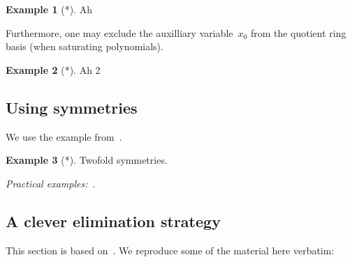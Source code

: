 \documentclass[11pt,a4paper]{article}
\theoremstyle{definition}
\newtheorem{example}{Example}
\begin{document}
\begin{example}[*]
Ah
\end{example}

Furthermore, one may exclude the auxilliary variable~$x_0$ from the quotient ring basis
(when saturating polynomials).

\begin{example}[*]
Ah 2
\end{example}

\subsection{Using symmetries}
We use the example from~\cite{larsson2016eccv}.

\begin{example}[*]
Twofold symmetries.
\end{example}

\emph{Practical examples:}~\cite{larsson-etal-cvpr-2018,wu-cvpr-2015}.

\subsection{A clever elimination strategy}
This section is based on~\cite{kukelova-etal-2017-cvpr}. We reproduce some of the material
here verbatim:
\end{document}
